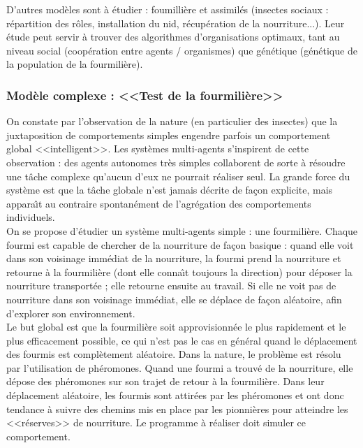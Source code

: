 \documentclass[11pt,twoside,a4paper]{article}
\begin{document}
D'autres mod{\`e}les sont {\`a} {\'e}tudier : foumilli{\`e}re et assimil{\'e}s (insectes sociaux : r{\'e}partition des r{\^o}les, installation du nid, r{\'e}cup{\'e}ration de la nourriture...). Leur {\'e}tude peut servir {\`a} trouver des algorithmes d'organisations optimaux, tant au niveau social (coop{\'e}ration entre agents / organismes) que g{\'e}n{\'e}tique (g{\'e}n{\'e}tique de la population de la fourmili{\`e}re).  

\subsubsection{Mod{\`e}le complexe : <<Test de la fourmili{\`e}re>>}

On constate par l'observation de la nature (en particulier des insectes) que la juxtaposition de comportements simples engendre parfois un comportement global <<intelligent>>. Les syst{\`e}mes multi-agents s'inspirent de cette observation : des agents autonomes tr{\`e}s simples collaborent de sorte {\`a} r{\'e}soudre une t{\^a}che complexe qu'aucun d'eux ne pourrait r{\'e}aliser seul. La grande force du syst{\`e}me est que la t{\^a}che globale n'est jamais d{\'e}crite de fa\c{c}on explicite, mais appara{\^\i}t au contraire spontan{\'e}ment de l'agr{\'e}gation des comportements individuels.~\\

On se propose d'{\'e}tudier un syst{\`e}me multi-agents simple : une fourmili{\`e}re. Chaque fourmi est capable de chercher de la nourriture de fa\c{c}on basique : quand elle voit dans son voisinage imm{\'e}diat de la nourriture, la fourmi prend la nourriture et retourne {\`a} la fourmili{\`e}re (dont elle conna{\^\i}t toujours la direction) pour d{\'e}poser la nourriture transport{\'e}e ; elle retourne ensuite au travail. Si elle ne voit pas de nourriture dans son voisinage imm{\'e}diat, elle se d{\'e}place de fa\c{c}on al{\'e}atoire, afin d'explorer son environnement.~\\

Le but global est que la fourmili{\`e}re soit approvisionn{\'e}e le plus rapidement et le plus efficacement possible, ce qui n'est pas le cas en g{\'e}n{\'e}ral quand le d{\'e}placement des fourmis est compl{\`e}tement al{\'e}atoire. Dans la nature, le probl{\`e}me est r{\'e}solu par l'utilisation de ph{\'e}romones. Quand une fourmi a trouv{\'e} de la nourriture, elle d{\'e}pose des ph{\'e}romones sur son trajet de retour {\`a} la fourmili{\`e}re. Dans leur d{\'e}placement al{\'e}atoire, les fourmis sont attir{\'e}es par les ph{\'e}romones et ont donc tendance {\`a} suivre des chemins mis en place par les pionni{\`e}res pour atteindre les <<r{\'e}serves>> de nourriture. Le programme {\`a} r{\'e}aliser doit simuler ce comportement.~\\
\end{document}
